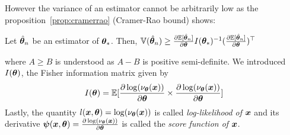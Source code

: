 However the variance of an estimator cannot be arbitrarily low as the
proposition~\ref{prop:cramerrao} (Cramer-Rao bound) shows:
\begin{prop}
  \label{prop:cramerrao}
  Let $\hat{\boldsymbol{\theta}}_n$ be an estimator of $\boldsymbol{\theta}_*$.
  Then, $\mathbb{V}(\hat{\boldsymbol{\theta}}_n) \geq
  \frac{ \partial \mathbb{E}[\hat{\boldsymbol{\theta}}_n]}{\partial \boldsymbol{\theta}}I(\boldsymbol{\theta}_*)^{-1} (\frac{ \partial \mathbb{E}[\hat{\boldsymbol{\theta}}_n]}{\partial \boldsymbol{\theta}})^{\top}$
\end{prop}
where $A \geq B$ is understood as $A-B$ is positive semi-definite.
We introduced $I(\boldsymbol{\theta})$, the Fisher information matrix given by
\begin{align}
  I(\boldsymbol{\theta}) = \mathbb{E}[\frac{ \partial \log(\nu_{\boldsymbol{\theta}}(\boldsymbol{x}))}{\partial \boldsymbol{\theta}} \times \frac{ \partial \log(\nu_{\boldsymbol{\theta}}(\boldsymbol{x}))}{\partial \boldsymbol{\theta}}]
\end{align}
Lastly, the quantity $l(\boldsymbol{x}, \boldsymbol{\theta}) = \log(\nu_{\boldsymbol{\theta}}(\boldsymbol{x}))$ is called
\emph{log-likelihood of $\boldsymbol{x}$} and its derivative $\boldsymbol{\psi}(\boldsymbol{x}, \boldsymbol{\theta}) =
\frac{ \partial \log(\nu_{\boldsymbol{\theta}}(\boldsymbol{x}))}{\partial \boldsymbol{\theta}}$ is called the \emph{score
  function of $\boldsymbol{x}$}. 
